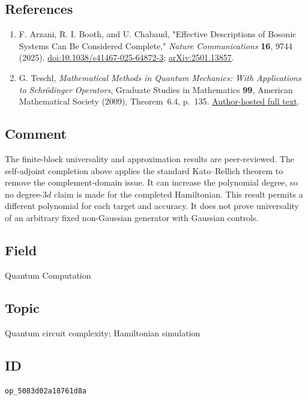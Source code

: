 \subsection*{References}

\begin{enumerate}[label={},leftmargin=4.8em,labelsep=0.5em]
  \footnotesize
  \item[\textup{[ABC25]}]\label{ref:poly-universal-abc}
  F. Arzani, R. I. Booth, and U. Chabaud, "Effective Descriptions of Bosonic Systems Can Be Considered Complete," \emph{Nature Communications} \textbf{16}, 9744 (2025). \href{https://doi.org/10.1038/s41467-025-64872-3}{doi:10.1038/s41467-025-64872-3}; \href{https://arxiv.org/abs/2501.13857}{arXiv:2501.13857}.

  \item[\textup{[Tes09]}]\label{ref:poly-universal-teschl}
  G. Teschl, \emph{Mathematical Methods in Quantum Mechanics: With Applications to Schr\"odinger Operators}, Graduate Studies in Mathematics \textbf{99}, American Mathematical Society (2009), Theorem~6.4, p.~135. \href{https://www.mat.univie.ac.at/~gerald/ftp/book-schroe/schroe.pdf}{Author-hosted full text}.
\end{enumerate}

\subsection*{Comment}

The finite-block universality and approximation results are peer-reviewed.
The self-adjoint completion above applies the standard Kato--Rellich theorem to remove the complement-domain issue.
It can increase the polynomial degree, so no degree-$3d$ claim is made for the completed Hamiltonian.
This result permits a different polynomial for each target and accuracy.
It does not prove universality of an arbitrary fixed non-Gaussian generator with Gaussian controls.

\subsection*{Field}

Quantum Computation

\subsection*{Topic}

Quantum circuit complexity; Hamiltonian simulation

\subsection*{ID}

\texttt{op\_5083d02a18761d8a}

